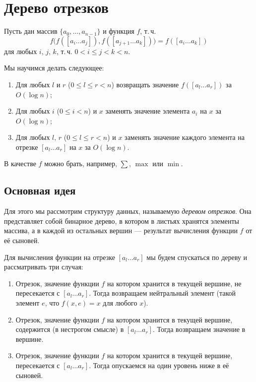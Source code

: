 \section{Дерево отрезков}

Пусть дан массив $\{a_0, \ldots, a_{n - 1}\}$ и функция $f$, т.\,ч. 
\[
    f\big(f([a_i\ldots a_j]), f([a_{j + 1}\ldots a_k])\big) = f([a_i\ldots a_k])
\]
для любых $i$, $j$, $k$, т.\,ч. $0 < i \leqslant j < k < n$.

\noindent
Мы научимся делать следующее:

\begin{enumerate}[nolistsep]
    \item Для любых $l$ и $r$ ($0 \leqslant l \leqslant r < n$) возвращать значение $f([a_l\ldots a_r])$ за $O(\log n)$;
    \item Для любых $i$ ($0 \leqslant i < n$) и $x$ заменять значение элемента $a_i$ на $x$ за~$O(\log n)$;
    \item Для любых $l$, $r$ ($0 \leqslant l \leqslant r < n$) и $x$ заменять значение каждого элемента на отрезке $[a_l\ldots a_r]$ на $x$ за $O(\log n)$.
\end{enumerate}

\begin{example}
    В качестве $f$ можно брать, например, $\sum$, $\max$ или $\min$.
\end{example}

\subsection{Основная идея}

Для этого мы рассмотрим структуру данных, называемую \textit{деревом отрезков}. Она представляет собой бинарное дерево, в котором в листьях хранятся элементы массива, а в каждой из остальных вершин --- результат вычисления функции $f$ от её сыновей.

Для вычисления функции на отрезке $[a_l\ldots a_r]$ мы будем спускаться по дереву и рассматривать три случая:

\begin{enumerate}[nolistsep]
    \item Отрезок, значение функции $f$ на котором хранится в текущей вершине, не пересекается с $[a_l\ldots a_r]$. Тогда возвращаем нейтральный элемент (такой элемент $e$, что $f(x, e) = x$ для любого $x$).
    \item Отрезок, значение функции $f$ на котором хранится в текущей вершине, содержится (в нестрогом смысле) в $[a_l\ldots a_r]$. Тогда возвращаем значение в вершине.
    \item Отрезок, значение функции $f$ на котором хранится в текущей вершине, пересекается с $[a_l\ldots a_r]$. Тогда опускаемся на один уровень ниже в её сыновей.
\end{enumerate}

